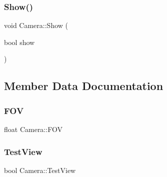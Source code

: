 \hypertarget{class_camera_a30ac44be4d88db523fc32bf00c395212}{}\label{class_camera_a30ac44be4d88db523fc32bf00c395212} 
\subsubsection{\texorpdfstring{Show()}{Show()}}
{\footnotesize\ttfamily void Camera\+::\+Show (\begin{DoxyParamCaption}\item[{bool}]{show }\end{DoxyParamCaption})}



\subsection{Member Data Documentation}
\hypertarget{class_camera_a3da8abd27e67cf8ebca6a8fadc4bae43}{}\label{class_camera_a3da8abd27e67cf8ebca6a8fadc4bae43} 
\subsubsection{\texorpdfstring{F\+OV}{FOV}}
{\footnotesize\ttfamily float Camera\+::\+F\+OV}

\hypertarget{class_camera_a8be8f1ca0c8dbdf62b92cef368f67584}{}\label{class_camera_a8be8f1ca0c8dbdf62b92cef368f67584} 
\subsubsection{\texorpdfstring{Test\+View}{TestView}}
{\footnotesize\ttfamily bool Camera\+::\+Test\+View}

